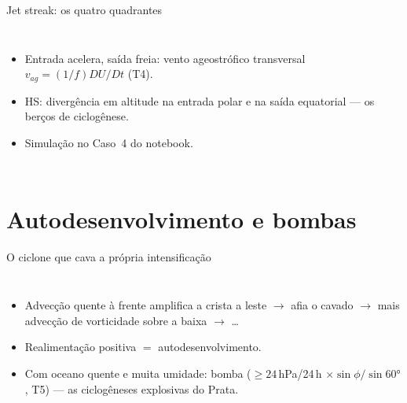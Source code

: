 \documentclass[aspectratio=169,11pt]{beamer}
\begin{document}
\begin{frame}{Jet streak: os quatro quadrantes}
  \begin{columns}
    \begin{itemize}
      \item Entrada acelera, saída freia: vento ageostrófico
            transversal $v_{ag} = (1/f)DU/Dt$ (T4).
      \item HS: divergência em altitude na \alert{entrada polar} e na
            \alert{saída equatorial} — os berços de ciclogênese.
      \item Simulação no Caso~4 do notebook.
    \end{itemize}
  \end{columns}
\end{frame}

\section{Autodesenvolvimento e bombas}

\begin{frame}{O ciclone que cava a própria intensificação}
  \begin{columns}
    \begin{itemize}
      \item Advecção quente à frente amplifica a crista a leste
            $\to$ afia o cavado $\to$ mais advecção de vorticidade
            sobre a baixa $\to$ \ldots
      \item Realimentação positiva $=$ \alert{autodesenvolvimento}.
      \item Com oceano quente e muita umidade: \alert{bomba}
            ($\ge 24$\,hPa/24\,h $\times \sin\phi/\sin60°$, T5) — as
            ciclogêneses explosivas do Prata.
    \end{itemize}
  \end{columns}
\end{frame}
\end{document}
